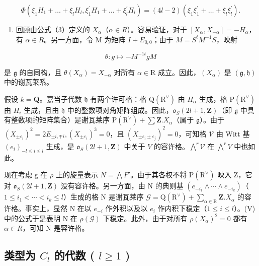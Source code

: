 \[
\varPhi (\xi_ {1} H _ {1} + \dots + \xi_ {l} H _ {l}, \xi_ {1} ^ {\prime} H _ {1} + \dots + \xi_ {l} ^ {\prime} H _ {l}) = (4 l - 2) (\xi_ {1} \xi_ {1} ^ {\prime} + \dots + \xi_ {l} \xi_ {l} ^ {\prime}).
\]

\begin{enumerate}
\def\labelenumi{(\Roman{enumi})}
\setcounter{enumi}{8}
\tightlist
\item
回顾由公式（3）定义的 \(X_{\alpha}\)（\(\alpha \in R\)）。容易验证，对于 \([X_{\alpha}, X_{-\alpha}] = -H_{\alpha}\)，有 \(\alpha \in R\)。另一方面，令 M 为矩阵 \(I + E_{0,0}\)；由于 \(M = S^{t}M^{-1}S\)，映射
\end{enumerate}

\[
\theta : g \mapsto - M ^ {- 1 t} g M
\]

是 \(\mathfrak{g}\) 的自同构，且 \(\theta(X_{\alpha}) = X_{-\alpha}\) 对所有 \(\alpha \in \mathrm{R}\) 成立。因此，\((X_{\alpha})\) 是 \((\mathfrak{g},\mathfrak{h})\) 中的谢瓦莱系。

假设 \(k = \mathbf{Q}\)。嘉当子代数 \(\mathfrak{h}\) 有两个许可格：格 \(\mathrm{Q}(\mathrm{R}^{\vee})\) 由 \(H_{\alpha}\) 生成，格 \(\mathrm{P}(\mathrm{R}^{\vee})\) 由 \(H_{i}\) 生成，且由 \(\mathfrak{h}\) 中的整数项对角矩阵组成。因此，\(\mathfrak{o}_S(2l + 1, \mathbf{Z})\)（即 \(\mathfrak{g}\) 中具有整数项的矩阵集合）是谢瓦莱序 \(\mathrm{P}(\mathrm{R}^{\vee}) + \sum \mathbf{Z}.X_{\alpha}\)（属于 \(\mathfrak{g}\)）。由于 \((X_{\pm \varepsilon_i})^2 = 2E_{\pm i,\mp i}, (X_{\pm \varepsilon_i})^3 = 0\)，且 \((X_{\pm \varepsilon_i\pm \varepsilon_j})^2 = 0\)，可知格 \(\mathcal{V}\) 由 Witt 基 \((e_i)_{-l\leq i\leq l}\) 生成，是 \(\mathfrak{o}_S(2l + 1,\mathbf{Z})\) 中关于 \(V\) 的容许格。\(\bigwedge^r\mathcal{V}\) 在 \(\bigwedge^r V\) 中也如此。

现在考虑 g 在 \(\rho\) 上的旋量表示 \(N = \bigwedge F'\)。由于其各权不将 \(\mathrm{P}(\mathrm{R}^{\vee})\) 映入 Z，它对 \(\mathfrak{o}_{S}(2l + 1, \mathbf{Z})\) 没有容许格。另一方面，由 N 的典则基 \((e_{-i_{1}} \wedge \cdots \wedge e_{-i_{k}})\)（\(1 \leq i_{1} < \cdots < i_{k} \leq l\)）生成的格 N 是谢瓦莱序 \(\mathcal{G} = \mathrm{Q}(\mathrm{R}^{\vee}) + \sum_{\alpha \in \mathrm{R}} \mathbf{Z}. X_{\alpha}\) 的容许格。事实上，显然 N 在以 \(e_{-i}\) 作外积以及以 \(e_{i}\) 作内积下稳定（\(1 \leq i \leq l\)）。(V) 中的公式于是表明 N 在 \(\rho(\mathcal{G})\) 下稳定。此外，由于对所有 \(\rho(X_{\alpha})^{2} = 0\) 都有 \(\alpha \in R\)，可知 N 是容许格。

\subsection{\texorpdfstring{类型为 \(C_{l}\) 的代数 ( \(l \geq 1\) )}{类型为 C\_\{l\} 的代数 ( l \textbackslash geq 1 )}}

